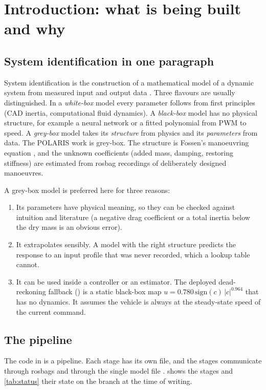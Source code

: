 \chapter{Introduction: what is being built and why}
\label{ch:intro}

\section{System identification in one paragraph}

System identification is the construction of a mathematical model of a dynamic system from
measured input and output data \cite{ljung1999}. Three flavours are usually distinguished.
In a \emph{white-box} model every parameter follows from first principles (CAD inertia, computational fluid dynamics).
A \emph{black-box} model has no physical structure, for example a neural network or a fitted
polynomial from PWM to speed. A \emph{grey-box} model takes its \emph{structure} from physics and its
\emph{parameters} from data. The POLARIS work is grey-box. The structure is Fossen's
manoeuvring equation \cite{fossen2011}, and the unknown coefficients (added mass, damping,
restoring stiffness) are estimated from rosbag recordings of deliberately designed manoeuvres.

A grey-box model is preferred here for three reasons:
\begin{enumerate}
  \item Its parameters have physical meaning, so they can be checked against intuition
        and literature (a negative drag coefficient or a total inertia below the dry
        mass is an obvious error).
  \item It extrapolates sensibly. A model with the right structure predicts the response to
        an input profile that was never recorded, which a lookup table cannot.
  \item It can be used inside a controller or an estimator. The deployed dead-reckoning
        fallback () is a static black-box map
        $u = 0.780\,\mathrm{sign}(c)\,|c|^{0.964}$ that has no dynamics. It assumes the vehicle is
        always at the steady-state speed of the current command.
\end{enumerate}

\section{The pipeline}

The code in  is a pipeline. Each stage has its own file, and the
stages communicate through rosbags and through the single model file .
 shows the stages and \cref{tab:status} their state on the
 branch at the time of writing.

